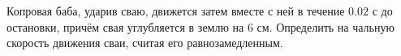 Копровая баба, ударив сваю, движется затем вместе с ней в течение $0.02$
с до остановки, причём свая углубляется в землю на $6$ см. Определить на
чальную скорость движения сваи, считая его равнозамедленным.
